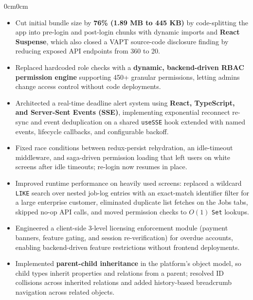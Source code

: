\documentclass[10pt, a4paper]{article}
\newenvironment{highlights}{
    \begin{itemize}[
        topsep=0.06 cm,
        parsep=0.03 cm,
        partopsep=0pt,
        itemsep=1.4pt,
        leftmargin=10pt
    ]
}{
    \end{itemize}
}
\newenvironment{onecolentry}{
    \begin{adjustwidth}{0cm}{0cm}
}{
    \end{adjustwidth}
}
\newcommand{\lighttext}[1]{{\fontsize{9.3pt}{11.2pt}\selectfont #1}}
\begin{document}
\begin{onecolentry}
    \begin{highlights}
        \item \lighttext{Cut initial bundle size by \textbf{76\% (1.89 MB to 445 KB)} by code-splitting the app into pre-login and post-login chunks with dynamic imports and \textbf{React Suspense}, which also closed a VAPT source-code disclosure finding by reducing exposed API endpoints from 360 to 20.}

        \item \lighttext{Replaced hardcoded role checks with a \textbf{dynamic, backend-driven RBAC permission engine} supporting 450+ granular permissions, letting admins change access control without code deployments.}

        \item \lighttext{Architected a real-time deadline alert system using \textbf{React, TypeScript, and Server-Sent Events (SSE)}, implementing exponential reconnect re-sync and event deduplication on a shared \texttt{useSSE} hook extended with named events, lifecycle callbacks, and configurable backoff.}

        \item \lighttext{Fixed race conditions between redux-persist rehydration, an idle-timeout middleware, and saga-driven permission loading that left users on white screens after idle timeouts; re-login now resumes in place.}

        \item \lighttext{Improved runtime performance on heavily used screens: replaced a wildcard \texttt{LIKE} search over nested job-log entries with an exact-match identifier filter for a large enterprise customer, eliminated duplicate list fetches on the Jobs tabs, skipped no-op API calls, and moved permission checks to $O(1)$ \texttt{Set} lookups.}

        \item \lighttext{Engineered a client-side 3-level licensing enforcement module (payment banners, feature gating, and session re-verification) for overdue accounts, enabling backend-driven feature restrictions without frontend deployments.}

        \item \lighttext{Implemented \textbf{parent-child inheritance} in the platform's object model, so child types inherit properties and relations from a parent; resolved ID collisions across inherited relations and added history-based breadcrumb navigation across related objects.}

    \end{highlights}
\end{onecolentry}
\end{document}
